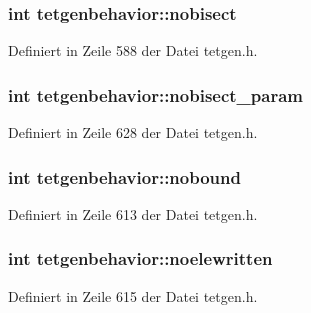 \hypertarget{classtetgenbehavior_a14b1ffe9dae2e1849d22739d2ef3ba20}{
\subsubsection[{nobisect}]{\setlength{\rightskip}{0pt plus 5cm}int tetgenbehavior\-::nobisect}}\label{classtetgenbehavior_a14b1ffe9dae2e1849d22739d2ef3ba20}


Definiert in Zeile 588 der Datei tetgen.\-h.

\hypertarget{classtetgenbehavior_a6a331aa8b36d3f8dfee8b7fd8102520a}{
\subsubsection[{nobisect\-\_\-param}]{\setlength{\rightskip}{0pt plus 5cm}int tetgenbehavior\-::nobisect\-\_\-param}}\label{classtetgenbehavior_a6a331aa8b36d3f8dfee8b7fd8102520a}


Definiert in Zeile 628 der Datei tetgen.\-h.

\hypertarget{classtetgenbehavior_a1e2af153b5b7a271191e021c518f3d83}{
\subsubsection[{nobound}]{\setlength{\rightskip}{0pt plus 5cm}int tetgenbehavior\-::nobound}}\label{classtetgenbehavior_a1e2af153b5b7a271191e021c518f3d83}


Definiert in Zeile 613 der Datei tetgen.\-h.

\hypertarget{classtetgenbehavior_aff425c4d5438943c01a986bde56d163a}{
\subsubsection[{noelewritten}]{\setlength{\rightskip}{0pt plus 5cm}int tetgenbehavior\-::noelewritten}}\label{classtetgenbehavior_aff425c4d5438943c01a986bde56d163a}


Definiert in Zeile 615 der Datei tetgen.\-h.

